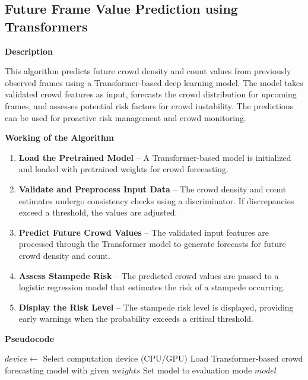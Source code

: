 \documentclass[11pt]{report}
\begin{document}
\subsection{Future Frame Value Prediction using Transformers}

\textbf{Description}  

This algorithm predicts future crowd density and count values from previously observed frames using a Transformer-based deep learning model. The model takes validated crowd features as input, forecasts the crowd distribution for upcoming frames, and assesses potential risk factors for crowd instability. The predictions can be used for proactive risk management and  crowd monitoring.

\textbf{Working of the Algorithm}  

\begin{enumerate}
    \item \textbf{Load the Pretrained Model} – A Transformer-based model is initialized and loaded with pretrained weights for crowd forecasting.
    \item \textbf{Validate and Preprocess Input Data} – The crowd density and count estimates undergo consistency checks using a discriminator. If discrepancies exceed a threshold, the values are adjusted.
    \item \textbf{Predict Future Crowd Values} – The validated input features are processed through the Transformer model to generate forecasts for future crowd density and count.
    \item \textbf{Assess Stampede Risk} – The predicted crowd values are passed to a logistic regression model that estimates the risk of a stampede occurring.
    \item \textbf{Display the Risk Level} – The stampede risk level is displayed, providing early warnings when the probability exceeds a critical threshold.
\end{enumerate}  

\textbf{Pseudocode}  

\begin{algorithm}[H]
\caption{Load Pretrained Model}
\begin{algorithmic}[1]
    \State $device \gets$ Select computation device (CPU/GPU)
    \State Load Transformer-based crowd forecasting model with given $weights$
    \State Set model to evaluation mode
    \State \Return $model$
\EndFunction
\end{algorithmic}
\end{algorithm}
\end{document}
